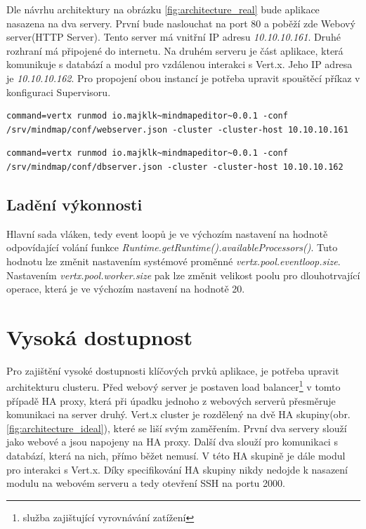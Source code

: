 Dle návrhu architektury na obrázku \ref{fig:architecture_real} bude aplikace nasazena na dva servery. První bude naslouchat na port 80 a poběží zde Webový server(HTTP Server). Tento server má vnitřní IP adresu \emph{10.10.10.161}. Druhé rozhraní má připojené do internetu. Na druhém serveru je část aplikace, která komunikuje s databází a modul pro vzdálenou interakci s Vert.x. Jeho IP adresa je \emph{10.10.10.162}. Pro propojení obou instancí je potřeba upravit spouštěcí příkaz v konfiguraci Supervisoru.

\begin{lstlisting}[caption=Spuštění clusteru na Serveru 1]
command=vertx runmod io.majklk~mindmapeditor~0.0.1 -conf /srv/mindmap/conf/webserver.json -cluster -cluster-host 10.10.10.161
\end{lstlisting}

\begin{lstlisting}[caption=Spuštění clusteru na Serveru 2]
command=vertx runmod io.majklk~mindmapeditor~0.0.1 -conf /srv/mindmap/conf/dbserver.json -cluster -cluster-host 10.10.10.162
\end{lstlisting}

\subsection{Ladění výkonnosti}\label{sub:performenceScale}

Hlavní sada vláken, tedy event loopů je ve výchozím nastavení na hodnotě odpovídající volání funkce \emph{Runtime.getRuntime().availableProcessors()}. Tuto hodnotu lze změnit nastavením systémové proměnné \emph{vertx.pool.eventloop.size}. Nastavením \emph{vertx.pool.worker.size} pak lze změnit velikost poolu pro dlouhotrvající operace, která je ve výchozím nastavení na hodnotě 20.

\section{Vysoká dostupnost}

Pro zajištění vysoké dostupnosti klíčových prvků aplikace, je potřeba upravit architekturu clusteru. Před webový server je postaven load balancer\footnote{služba zajištující vyrovnávání zatížení} v tomto případě HA proxy, která při úpadku jednoho z webových serverů přesměruje komunikaci na server druhý. Vert.x cluster je rozdělený na dvě HA skupiny(obr.\ref{fig:architecture_ideal}), které se liší svým zaměřením. První dva servery slouží jako webové a jsou napojeny na HA proxy. Další dva slouží pro komunikaci s databází, která na nich, přímo běžet nemusí. V této HA skupině je dále modul pro interakci s Vert.x. Díky specifikování HA skupiny nikdy nedojde k nasazení modulu na webovém serveru a tedy otevření SSH na portu 2000.

